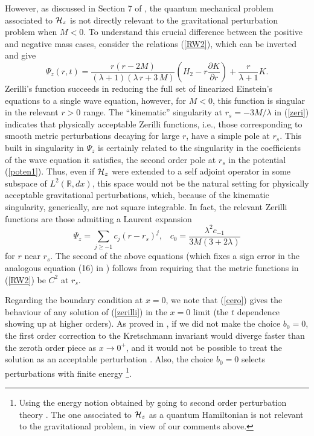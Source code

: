\documentclass[aps,floats,showpacs,amssymb,tightenlines]{revtex4}
\begin{document}
However, as discussed in Section 7 of \cite{dg}, the quantum mechanical problem associated to ${\cal H}_z$ is not directly relevant to the gravitational perturbation problem when $M<0$.
To understand this crucial difference between the positive and negative mass cases,
consider the  relations (\ref{RW2}), which can be inverted and give
\begin{equation}
\label{zeri}
\Psi_z(r,t)  = \frac {r (r-2M)}{ ( \lambda+1 )  ( \lambda
\,r+3\,M ) } \left(H_2
 - r  \frac {\partial K}{\partial r}
\right)
    +\frac{r}{\lambda+1} K.
\end{equation}
Zerilli's function
succeeds in reducing the full set of linearized Einstein's equations to a single wave equation, however, for $M<0$, this function
is singular in the relevant $r>0$ range. The ``kinematic'' singularity at $r_s=-3M/\lambda$ in (\ref{zeri}) indicates
that physically acceptable Zerilli functions, i.e., those corresponding to smooth metric perturbations decaying for large $r$,
 have a simple pole at $r_s$. This built in singularity in $\Psi_z$ is certainly related  to the singularity in the
coefficients of the wave equation it satisfies, the second order pole at $r_s$ in the potential (\ref{poten1}).
Thus, even if  ${\cal H}_z$ were extended to a  self adjoint operator in some subspace of  $L^2({\mathbb R},dx)$,
this space would not be the natural setting for
physically acceptable gravitational perturbations, which, because of the kinematic singularity, generically, are not square integrable. In fact, the relevant Zerilli functions
are those admitting a Laurent expansion
\begin{equation} \label{crc}
\Psi_z = \sum_{j \geq -1}  c_j (r-r_s)^j, \;\;\; c_0 = \frac{\lambda^2  c_{-1}}{3M (3 + 2 \lambda)}
\end{equation}
for $r$ near $r_s$. The second of the above equations (which fixes a sign error in the analogous equation (16) in \cite{dg})
follows from requiring that the metric functions in (\ref{RW2}) be $C^2$ at $r_s$.

Regarding the boundary condition at $x=0$, we note that (\ref{cero}) gives the behaviour of any
solution of (\ref{zerilli})  in the $x =0$ limit (the $t$ dependence showing up at higher orders). As proved in \cite{ghi,dg}, if we did not make the choice $b_0=0$, the first order correction
to the Kretschmann invariant would diverge faster than the  zeroth order piece as  $x \to 0^+$, and it would not be possible to treat the solution as an acceptable perturbation \cite{dg}.
Also, the choice $b_0=0$
selects perturbations with finite energy \footnote{Using the energy notion obtained by going to
second order perturbation theory \cite{ghi}. The one associated to ${\cal H}_z$ as a quantum Hamiltonian
is not relevant to the gravitational problem, in view of our comments above.}.
\end{document}
